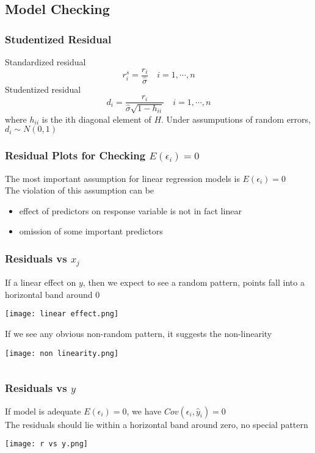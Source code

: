 \documentclass[11pt]{article}
\begin{document}
\subsection{Model Checking}
\subsubsection{Studentized Residual}
Standardized residual 
\[r_i^s = \frac{r_i}{\hat\sigma}\quad i=1,\cdots,n\] 
Studentized residual 
\[d_i = \frac{r_i}{\hat\sigma\sqrt{1-h_{ii}}}\quad i=1,\cdots,n\]
where $h_{ii}$ is the ith diagonal element of $H$. Under assumputions of random errors, $d_i\sim N(0,1)$
\subsubsection{Residual Plots for Checking $E(\epsilon_i)=0$}
The most important assumption for linear regression models is $E(\epsilon_i)=0$ \\
The violation of this assumption can be 
\begin{itemize}
    \item effect of predictors on response variable is not in fact linear 
    \item omission of some important predictors 
\end{itemize}
\subsubsection{Residuals vs $x_j$}
If a linear effect on $y$, then we expect to see a random pattern, points fall into a horizontal band around $0$ \\
\begin{figure*}[h!]
    \centering
    \texttt{[image: linear effect.png]}
\end{figure*}
$\ $\\
If we see any obvious non-random pattern, it suggests the non-linearity \\
\begin{figure*}[h!]
    \centering
    \texttt{[image: non linearity.png]}
\end{figure*}
$\ $\\
\subsubsection{Residuals vs $\hat y$}
If model is adequate $E(\epsilon_i)=0$, we have $Cov(\epsilon_i,\hat y_i)=0$ \\
The residuals should lie within a horizontal band around zero, no special pattern 
\begin{figure*}[h!]
    \centering
    \texttt{[image: r vs y.png]}
\end{figure*}
$\ $\\
\end{document}
